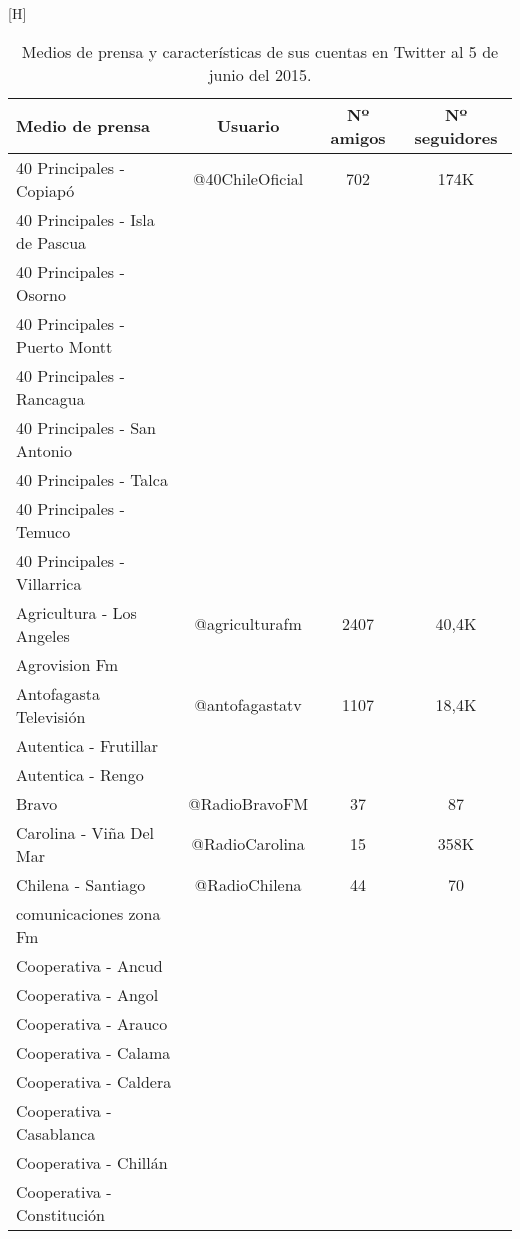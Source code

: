 \begin{center}[H]
	\centering
		\begin{longtable}{| l | c | c | c |}
		\caption {Medios de prensa y características de sus cuentas en Twitter al 5 de junio del 2015.}
		\label{table:archiMedios}
		\hline
			Medio de prensa    & Usuario  & Nº amigos & Nº seguidores \\ \hline	
40 Principales - Copiapó	&	@40ChileOficial	&	702	&	174K	\\ \hline
40 Principales - Isla de Pascua	&		&		&		\\ \hline
40 Principales - Osorno	&		&		&		\\ \hline
40 Principales - Puerto Montt	&		&		&		\\ \hline
40 Principales - Rancagua	&		&		&		\\ \hline
40 Principales - San Antonio	&		&		&		\\ \hline
40 Principales - Talca	&		&		&		\\ \hline
40 Principales - Temuco	&		&		&		\\ \hline
40 Principales - Villarrica	&		&		&		\\ \hline
Agricultura - Los Angeles	&	@agriculturafm	&	2407	&	40,4K	\\ \hline
Agrovision Fm	&		&		&		\\ \hline
Antofagasta Televisión	&	@antofagastatv	&	1107	&	18,4K	\\ \hline
Autentica - Frutillar	&		&		&		\\ \hline
Autentica - Rengo	&		&		&		\\ \hline
Bravo	&	@RadioBravoFM	&	37	&	87	\\ \hline
Carolina - Viña Del Mar	&	@RadioCarolina	&	15	&	358K	\\ \hline
Chilena - Santiago	&	@RadioChilena	&	44	&	70	\\ \hline
comunicaciones zona Fm	&		&		&		\\ \hline
Cooperativa - Ancud	&		&		&		\\ \hline
Cooperativa - Angol	&		&		&		\\ \hline
Cooperativa - Arauco	&		&		&		\\ \hline
Cooperativa - Calama	&		&		&		\\ \hline
Cooperativa - Caldera	&		&		&		\\ \hline
Cooperativa - Casablanca	&		&		&		\\ \hline
Cooperativa - Chillán	&		&		&		\\ \hline
Cooperativa - Constitución	&		&		&		\\ \hline

\end{longtable}
\end{center}
